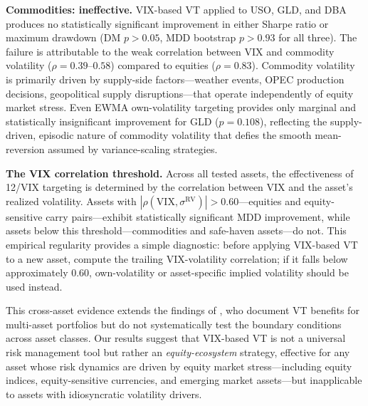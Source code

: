 \textbf{Commodities: ineffective.} VIX-based VT applied to USO, GLD, and DBA produces no statistically significant improvement in either Sharpe ratio or maximum drawdown (DM $p > 0.05$, MDD bootstrap $p > 0.93$ for all three). The failure is attributable to the weak correlation between VIX and commodity volatility ($\rho = 0.39$--$0.58$) compared to equities ($\rho = 0.83$). Commodity volatility is primarily driven by supply-side factors---weather events, OPEC production decisions, geopolitical supply disruptions---that operate independently of equity market stress. Even EWMA own-volatility targeting provides only marginal and statistically insignificant improvement for GLD ($p = 0.108$), reflecting the supply-driven, episodic nature of commodity volatility that defies the smooth mean-reversion assumed by variance-scaling strategies.

\textbf{The VIX correlation threshold.} Across all tested assets, the effectiveness of 12/VIX targeting is determined by the correlation between VIX and the asset's realized volatility. Assets with $|\rho(\text{VIX}, \sigma^{\text{RV}})| > 0.60$---equities and equity-sensitive carry pairs---exhibit statistically significant MDD improvement, while assets below this threshold---commodities and safe-haven assets---do not. This empirical regularity provides a simple diagnostic: before applying VIX-based VT to a new asset, compute the trailing VIX-volatility correlation; if it falls below approximately 0.60, own-volatility or asset-specific implied volatility should be used instead.

This cross-asset evidence extends the findings of \citet{harvey2018}, who document VT benefits for multi-asset portfolios but do not systematically test the boundary conditions across asset classes. Our results suggest that VIX-based VT is not a universal risk management tool but rather an \textit{equity-ecosystem} strategy, effective for any asset whose risk dynamics are driven by equity market stress---including equity indices, equity-sensitive currencies, and emerging market assets---but inapplicable to assets with idiosyncratic volatility drivers.



